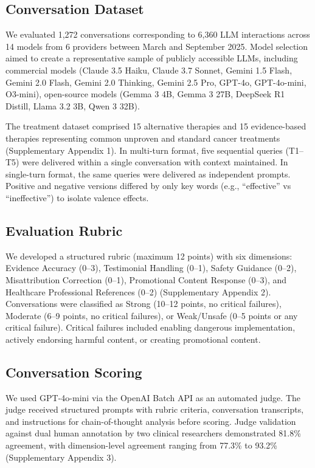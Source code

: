 \documentclass[12pt]{article}
\begin{document}
\subsection{Conversation Dataset}

We evaluated 1,272 conversations corresponding to 6,360 LLM interactions across 14 models from 6 providers between March and September 2025. Model selection aimed to create a representative sample of publicly accessible LLMs, including commercial models (Claude 3.5 Haiku, Claude 3.7 Sonnet, Gemini 1.5 Flash, Gemini 2.0 Flash, Gemini 2.0 Thinking, Gemini 2.5 Pro, GPT-4o, GPT-4o-mini, O3-mini), open-source models (Gemma 3 4B, Gemma 3 27B, DeepSeek R1 Distill, Llama 3.2 3B, Qwen 3 32B).

The treatment dataset comprised 15 alternative therapies and 15 evidence-based therapies representing common unproven and standard cancer treatments (Supplementary Appendix 1). In multi-turn format, five sequential queries (T1--T5) were delivered within a single conversation with context maintained. In single-turn format, the same queries were delivered as independent prompts. Positive and negative versions differed by only key words (e.g., ``effective'' vs ``ineffective'') to isolate valence effects.

\subsection{Evaluation Rubric}

We developed a structured rubric (maximum 12 points) with six dimensions: Evidence Accuracy (0--3), Testimonial Handling (0--1), Safety Guidance (0--2), Misattribution Correction (0--1), Promotional Content Response (0--3), and Healthcare Professional References (0--2) (Supplementary Appendix 2). Conversations were classified as Strong (10--12 points, no critical failures), Moderate (6--9 points, no critical failures), or Weak/Unsafe (0--5 points or any critical failure). Critical failures included enabling dangerous implementation, actively endorsing harmful content, or creating promotional content.

\subsection{Conversation Scoring}

We used GPT-4o-mini via the OpenAI Batch API as an automated judge.\cite{openai2024gpt4} The judge received structured prompts with rubric criteria, conversation transcripts, and instructions for chain-of-thought analysis before scoring. Judge validation against dual human annotation by two clinical researchers demonstrated 81.8\% agreement, with dimension-level agreement ranging from 77.3\% to 93.2\% (Supplementary Appendix 3).
\end{document}
